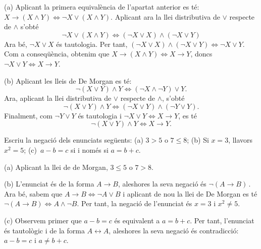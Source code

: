 \begin{solucio}
(a) Aplicant la primera equivalència de l'apartat anterior es té:
$X\longrightarrow\left(  X\wedge Y\right)  \Longleftrightarrow\lnot
X\vee\left(  X\wedge Y\right)  $. Aplicant ara la llei distributiva de $\vee$
respecte de $\wedge$ s'obté%
\[
\lnot X\vee\left(  X\wedge Y\right)  \Longleftrightarrow\left(  \lnot X\vee
X\right)  \wedge\left(  \lnot X\vee Y\right)
\]
Ara bé, $\lnot X\vee X$ és tautologia. Per tant, $\left(  \lnot X\vee
X\right)  \wedge\left(  \lnot X\vee Y\right)  \Longleftrightarrow\lnot X\vee Y
$. Com a conseqüència, obtenim que $X\longrightarrow\left(  X\wedge Y\right)
\Longleftrightarrow X\longrightarrow Y$, doncs $\lnot X\vee
Y\Longleftrightarrow X\longrightarrow Y$.

(b) Aplicant les lleis de De Morgan es té:%
\[
\lnot\left(  X\vee Y\right)  \wedge Y\Longleftrightarrow\left(  \lnot
X\wedge\lnot Y\right)  \vee Y.
\]
Ara, aplicant la llei distributiva de $\vee$ respecte de $\wedge$, s'obté
\[
\lnot\left(  X\vee Y\right)  \wedge Y\Longleftrightarrow\left(  \lnot X\vee
Y\right)  \wedge\left(  \lnot Y\vee Y\right)  .
\]
Finalment, com $\lnot Y\vee Y$ és tautologia i $\lnot X\vee
Y\Longleftrightarrow X\longrightarrow Y$, es té%
\[
\lnot\left(  X\vee Y\right)  \wedge Y\Longleftrightarrow X\longrightarrow
Y\text{.}%
\]

\end{solucio}

\begin{exercici}
Escriu la negació dels enunciats següents: (a) $3>5$ o $7\leq8$; (b)
Si $x=3$, llavors $x^{2}=5$; (c)\ $a-b=c$ si i només si $a=b+c$.
\end{exercici}

\begin{solucio}
(a) Aplicant la llei de de Morgan, $3\leq5$ o $7>8$.

(b) L'enunciat és de la forma $A\longrightarrow B$, aleshores la seva
negació és $\lnot\left(  A\longrightarrow B\right)  \,$. Ara bé,
sabem que $A\longrightarrow B\Longleftrightarrow\lnot A\vee B$ i aplicant de
nou la llei de De Morgan es té $\lnot\left(  A\longrightarrow B\right)
\Longleftrightarrow A\wedge\lnot B$. Per tant, la negació de l'enunciat
és $x=3$ i $x^{2}\neq5$.

(c) Observem primer que $a-b=c$ és equivalent a $a=b+c$. Per tant,
l'enunciat és tautològic i de la forma $A\longleftrightarrow A$,
aleshores la seva negació és contradicció: $a-b=c$ i $a\neq b+c$.
\end{solucio}

